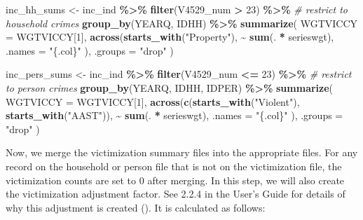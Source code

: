 \documentclass[
]{krantz}
\makeatletter
\newenvironment{Shaded}{\begin{snugshade}}{\end{snugshade}}
\newcommand{\AttributeTok}[1]{\textcolor[rgb]{0.27,0.27,0.27}{#1}}
\newcommand{\CommentTok}[1]{\textcolor[rgb]{0.37,0.37,0.37}{\textit{#1}}}
\newcommand{\DecValTok}[1]{\textcolor[rgb]{0.06,0.06,0.06}{#1}}
\newcommand{\FunctionTok}[1]{\textcolor[rgb]{0.27,0.27,0.27}{\textbf{#1}}}
\newcommand{\NormalTok}[1]{#1}
\newcommand{\OtherTok}[1]{\textcolor[rgb]{0.37,0.37,0.37}{#1}}
\newcommand{\SpecialCharTok}[1]{\textcolor[rgb]{0.43,0.43,0.43}{\textbf{#1}}}
\newcommand{\StringTok}[1]{\textcolor[rgb]{0.5,0.5,0.5}{#1}}
\newenvironment{kframe}{%
\medskip{}
\setlength{\fboxsep}{.8em}
 \def\at@end@of@kframe{}%
 \ifinner\ifhmode%
  \def\at@end@of@kframe{\end{minipage}}%
  \begin{minipage}{\columnwidth}%
 \fi\fi%
 \def\FrameCommand##1{\hskip\@totalleftmargin \hskip-\fboxsep
 \colorbox{shadecolor}{##1}\hskip-\fboxsep
     \hskip-\linewidth \hskip-\@totalleftmargin \hskip\columnwidth}%
 \MakeFramed {\advance\hsize-\width
   \@totalleftmargin\z@ \linewidth\hsize
   \@setminipage}}%
 {\par\unskip\endMakeFramed%
 \at@end@of@kframe}
\renewenvironment{Shaded}{\begin{kframe}}{\end{kframe}}
\makeatother
\begin{document}
\begin{Shaded}
\begin{Highlighting}[]
\NormalTok{inc\_hh\_sums }\OtherTok{\textless{}{-}}
\NormalTok{  inc\_ind }\SpecialCharTok{\%\textgreater{}\%}
  \FunctionTok{filter}\NormalTok{(V4529\_num }\SpecialCharTok{\textgreater{}} \DecValTok{23}\NormalTok{) }\SpecialCharTok{\%\textgreater{}\%} \CommentTok{\# restrict to household crimes}
  \FunctionTok{group\_by}\NormalTok{(YEARQ, IDHH) }\SpecialCharTok{\%\textgreater{}\%}
  \FunctionTok{summarize}\NormalTok{(}
    \AttributeTok{WGTVICCY =}\NormalTok{ WGTVICCY[}\DecValTok{1}\NormalTok{],}
    \FunctionTok{across}\NormalTok{(}\FunctionTok{starts\_with}\NormalTok{(}\StringTok{"Property"}\NormalTok{),}
      \SpecialCharTok{\textasciitilde{}} \FunctionTok{sum}\NormalTok{(. }\SpecialCharTok{*}\NormalTok{ serieswgt),}
      \AttributeTok{.names =} \StringTok{"\{.col\}"}
\NormalTok{    ),}
    \AttributeTok{.groups =} \StringTok{"drop"}
\NormalTok{  )}

\NormalTok{inc\_pers\_sums }\OtherTok{\textless{}{-}}
\NormalTok{  inc\_ind }\SpecialCharTok{\%\textgreater{}\%}
  \FunctionTok{filter}\NormalTok{(V4529\_num }\SpecialCharTok{\textless{}=} \DecValTok{23}\NormalTok{) }\SpecialCharTok{\%\textgreater{}\%} \CommentTok{\# restrict to person crimes}
  \FunctionTok{group\_by}\NormalTok{(YEARQ, IDHH, IDPER) }\SpecialCharTok{\%\textgreater{}\%}
  \FunctionTok{summarize}\NormalTok{(}
    \AttributeTok{WGTVICCY =}\NormalTok{ WGTVICCY[}\DecValTok{1}\NormalTok{],}
    \FunctionTok{across}\NormalTok{(}\FunctionTok{c}\NormalTok{(}\FunctionTok{starts\_with}\NormalTok{(}\StringTok{"Violent"}\NormalTok{), }\FunctionTok{starts\_with}\NormalTok{(}\StringTok{"AAST"}\NormalTok{)),}
      \SpecialCharTok{\textasciitilde{}} \FunctionTok{sum}\NormalTok{(. }\SpecialCharTok{*}\NormalTok{ serieswgt),}
      \AttributeTok{.names =} \StringTok{"\{.col\}"}
\NormalTok{    ),}
    \AttributeTok{.groups =} \StringTok{"drop"}
\NormalTok{  )}
\end{Highlighting}
\end{Shaded}

Now, we merge the victimization summary files into the appropriate files. For any record on the household or person file that is not on the victimization file, the victimization counts are set to 0 after merging. In this step, we will also create the victimization adjustment factor. See 2.2.4 in the User's Guide for details of why this adjustment is created (\citet{ncvs_user_guide}). It is calculated as follows:
\end{document}
